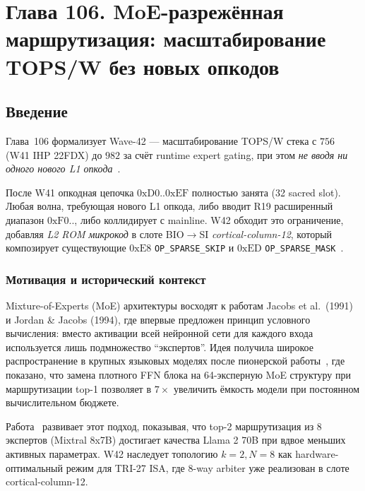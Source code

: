 
\chapter{Глава 106. MoE-разрежённая маршрутизация: масштабирование TOPS/W без новых опкодов}
\label{ch:glava-106-moe-sparse-routing}

\section{Введение}

Глава~106 формализует Wave-42 — масштабирование TOPS/W стека с $756$ (W41 IHP 22FDX) до $982$ за счёт runtime expert gating, при этом \emph{не вводя ни одного нового L1 опкода}~\cite{switch_transformer2021,mixtral2024}.

После W41 опкодная цепочка $0\mathrm{xD0}..0\mathrm{xEF}$ полностью занята (32 sacred slot). Любая волна, требующая нового L1 опкода, либо вводит R19 расширенный диапазон $0\mathrm{xF0}..$, либо коллидирует с mainline. W42 обходит это ограничение, добавляя \emph{L2 ROM микрокод} в слоте BIO$\to$SI \emph{cortical-column-12}, который композирует существующие $0\mathrm{xE8}$ \texttt{OP\_SPARSE\_SKIP} и $0\mathrm{xED}$ \texttt{OP\_SPARSE\_MASK}~\cite{lee_gvsu_proof2021,zenodo_trinity_2026}.

\subsection{Мотивация и исторический контекст}

Mixture-of-Experts (MoE) архитектуры восходят к работам Jacobs et al.\ (1991) и Jordan \& Jacobs (1994), где впервые предложен принцип условного вычисления: вместо активации всей нейронной сети для каждого входа используется лишь подмножество ``экспертов''. Идея получила широкое распространение в крупных языковых моделях после пионерской работы~\cite{switch_transformer2021}, где показано, что замена плотного FFN блока на 64-эксперную MoE структуру при маршрутизации top-1 позволяет в $7\times$ увеличить ёмкость модели при постоянном вычислительном бюджете.

Работа~\cite{mixtral2024} развивает этот подход, показывая, что top-2 маршрутизация из 8 экспертов (Mixtral 8x7B) достигает качества Llama 2 70B при вдвое меньших активных параметрах. W42 наследует топологию $k=2, N=8$ как hardware-оптимальный режим для TRI-27 ISA, где 8-way arbiter уже реализован в слоте cortical-column-12.

